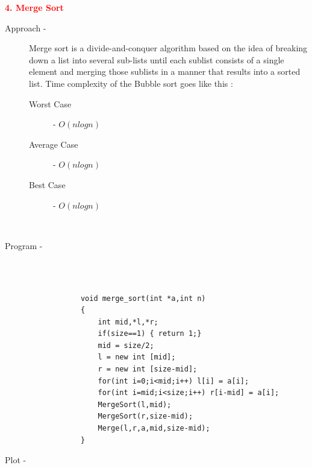 \documentclass[0pt]{article}
\begin{document}
	
	
	
	
	
	
	
	
	
	
	
	
	
	
	
	
	
	
	
	
	
	
	
	
	
	
	
	
	
	\begin{flushleft}
		\textbf{\textcolor{red}{4. Merge Sort}}
		\leavevmode \\
		\begin{description}
			\item[Approach - ] Merge sort is a divide-and-conquer algorithm based on the idea of breaking down a list into several sub-lists until each sublist consists of a single element and merging those sublists in a manner that results into a sorted list. Time complexity of the Bubble sort goes like this :  
			\leavevmode \\
			\begin{description}
				\item[Worst Case] - \(O(nlogn)\)
				\item[Average Case] - \(O(nlogn)\)
				\item[Best Case] - \(O(nlogn)\)
			\end{description}
			\leavevmode \\
			\item[Program - ] \leavevmode \\
			\leavevmode \\
			\begin{lstlisting}
			void merge_sort(int *a,int n)
			{
				int mid,*l,*r;
				if(size==1) { return 1;}
				mid = size/2;
				l = new int [mid];
				r = new int [size-mid];
				for(int i=0;i<mid;i++) l[i] = a[i];
				for(int i=mid;i<size;i++) r[i-mid] = a[i];
				MergeSort(l,mid);
				MergeSort(r,size-mid);
				Merge(l,r,a,mid,size-mid);
			}
			\end{lstlisting}
			\item[Plot - ] \leavevmode \\
		\end{description}
	\end{flushleft}
	\begin{center}
	\end{center}
	\leavevmode \\
	
\end{document}
